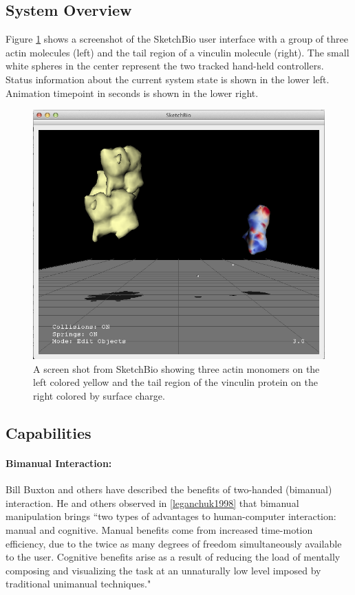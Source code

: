 \documentclass[twocolumn]{bmcart}%
\begin{document}
\subsection*{System Overview}

Figure \ref{fig:actin_vinculin} shows a screenshot of the SketchBio user interface with a group of three actin molecules (left) and the tail region of a vinculin molecule (right).  The small white spheres in the center represent the two tracked hand-held controllers. Status information about the current system state is shown in the lower left.  Animation timepoint in seconds is shown in the lower right.

\begin{figure}[ht]
\centering
\includegraphics[width=0.9\columnwidth]{actinVinculin.png}
\caption{A screen shot from SketchBio showing three actin monomers on the left colored yellow and the tail region of the vinculin protein on the right colored by surface charge.}
\label{fig:actin_vinculin}
\end{figure}

\subsection*{Capabilities}

\paragraph*{Bimanual Interaction:}
Bill Buxton and others have described the benefits of two-handed (bimanual) interaction.  He and others observed in \ref{leganchuk1998} that bimanual manipulation brings ``two types of advantages to human-computer interaction: manual and cognitive. Manual benefits come from increased time-motion efficiency, due to the twice as many degrees of freedom simultaneously available to the user. Cognitive benefits arise as a result of reducing the load of mentally composing and visualizing the task at an unnaturally low level imposed by traditional unimanual techniques."
\end{document}
